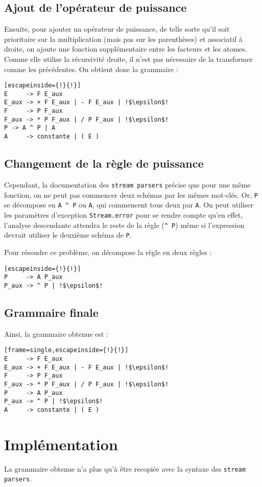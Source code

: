 \documentclass[11pt]{article}
\begin{document}
\subsection{Ajout de l'opérateur de puissance}
Ensuite, pour ajouter un opérateur de puissance, de telle sorte qu'il soit prioritaire sur la multiplication (mais pas sur les parenthèses) et associatif à droite, on ajoute une fonction supplémentaire entre les facteurs et les atomes. Comme elle utilise la récursivité droite, il n'est pas nécessaire de la transformer comme les précédentes. On obtient donc la grammaire : 
\begin{lstlisting}[escapeinside={!}{!}]
E     -> F E_aux
E_aux -> + F E_aux | - F E_aux | !$\epsilon$!
F     -> P F_aux
F_aux -> * P F_aux | / P F_aux | !$\epsilon$!
P -> A ^ P | A
A     -> constante | ( E )
\end{lstlisting}

\subsection{Changement de la règle de puissance}
Cependant, la documentation des \texttt{stream parsers} précise que pour une même fonction, on ne peut pas commencer deux schémas par les mêmes mot-clés. Or, \lstinline{P} se décompose en \lstinline{A ^ P} ou \lstinline{A}, qui commencent tous deux par \lstinline{A}. On peut utiliser les paramètres d'exception \texttt{Stream.error} pour se rendre compte qu'en effet, l'analyse descendante attendra le reste de la règle (\lstinline{^ P}) même si l'expression devrait utiliser le deuxième schéma de \lstinline{P}.

Pour résoudre ce problème, on décompose la règle en deux règles :
\begin{lstlisting}[escapeinside={!}{!}]
P     -> A P_aux
P_aux -> ^ P | !$\epsilon$!
\end{lstlisting}

\subsection{Grammaire finale}
Ainsi, la grammaire obtenue est :
\begin{lstlisting}[frame=single,escapeinside={!}{!}]
E     -> F E_aux
E_aux -> + F E_aux | - F E_aux | !$\epsilon$!
F     -> P F_aux
F_aux -> * P F_aux | / P F_aux | !$\epsilon$!
P     -> A P_aux
P_aux -> ^ P | !$\epsilon$!
A     -> constante | ( E )
\end{lstlisting}
 

\section{Implémentation}
La grammaire obtenue n'a plus qu'à être recopiée avec la syntaxe des \texttt{stream parsers}. 
\end{document}

